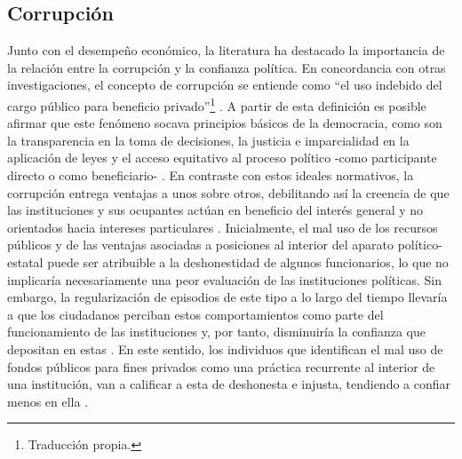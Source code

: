 \documentclass[12pt,twoside]{templates/facsothesis}
\begin{document}
\subsection{Corrupción}\label{corrupciuxf3n}

Junto con el desempeño económico, la literatura ha destacado la importancia de la relación entre la corrupción y la confianza política. En concordancia con otras investigaciones, el concepto de corrupción se entiende como ``el uso indebido del cargo público para beneficio privado''\footnote{Traducción propia.} \citep[p.32]{sandholtzAccountingCorruptionEconomic2000}. A partir de esta definición es posible afirmar que este fenómeno socava principios básicos de la democracia, como son la transparencia en la toma de decisiones, la justicia e imparcialidad en la aplicación de leyes y el acceso equitativo al proceso político -como participante directo o como beneficiario- \citep{andersonCorruptionPoliticalAllegiances2003}. En contraste con estos ideales normativos, la corrupción entrega ventajas a unos sobre otros, debilitando así la creencia de que las instituciones y sus ocupantes actúan en beneficio del interés general y no orientados hacia intereses particulares \citep{beesleyCorruptionInstitutionalTrust2022, uslanerCorruptionInequalityTrap2013}. Inicialmente, el mal uso de los recursos públicos y de las ventajas asociadas a posiciones al interior del aparato político-estatal puede ser atribuible a la deshonestidad de algunos funcionarios, lo que no implicaría necesariamente una peor evaluación de las instituciones políticas. Sin embargo, la regularización de episodios de este tipo a lo largo del tiempo llevaría a que los ciudadanos perciban estos comportamientos como parte del funcionamiento de las instituciones y, por tanto, disminuiría la confianza que depositan en estas \citep{beesleyCorruptionInstitutionalTrust2022}. En este sentido, los individuos que identifican el mal uso de fondos públicos para fines privados como una práctica recurrente al interior de una institución, van a calificar a esta de deshonesta e injusta, tendiendo a confiar menos en ella \citep{uslanerCorruptionInequalityTrap2013}.
\end{document}

